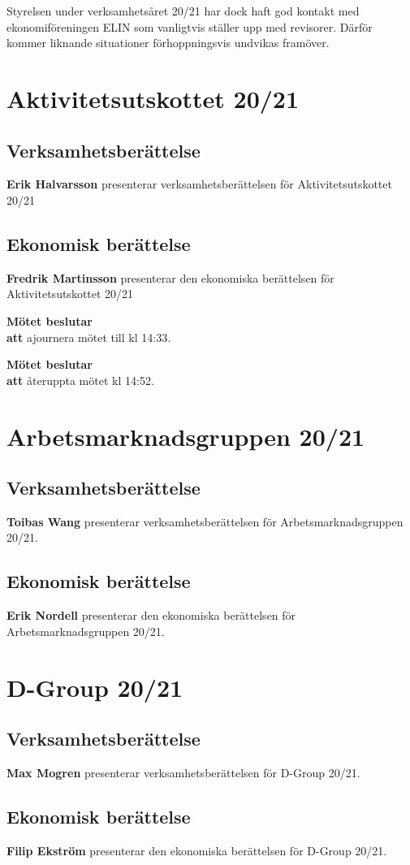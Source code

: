 \documentclass{datateknologsektionen-document}
\newcommand{\ind}{\hspace*{2em}}
\newcommand{\motetbeslutar}{\textbf{Mötet beslutar}}
\newcommand{\att}{\\\ind\textbf{att}}
\begin{document}
Styrelsen under verksamhetsåret 20/21 har dock haft god kontakt med ekonomiföreningen ELIN som vanligtvis ställer upp med revisorer. Därför kommer liknande situationer förhoppningsvis undvikas framöver.

\section{Aktivitetsutskottet 20/21}
\subsection{Verksamhetsberättelse}
\textbf{Erik Halvarsson} presenterar verksamhetsberättelsen för Aktivitetsutskottet 20/21
\subsection{Ekonomisk berättelse}
\textbf{Fredrik Martinsson} presenterar den ekonomiska berättelsen för Aktivitetsutskottet 20/21

\motetbeslutar
\att{} ajournera mötet till kl 14:33.

\motetbeslutar
\att{} återuppta mötet kl 14:52.


\pagebreak
\section{Arbetsmarknadsgruppen 20/21}
\subsection{Verksamhetsberättelse}
\textbf{Toibas Wang} presenterar verksamhetsberättelsen för Arbetsmarknadsgruppen 20/21.
\subsection{Ekonomisk berättelse}
\textbf{Erik Nordell} presenterar den ekonomiska berättelsen för Arbetsmarknadsgruppen 20/21.

\section{D-Group 20/21}
\subsection{Verksamhetsberättelse}
\textbf{Max Mogren} presenterar verksamhetsberättelsen för D-Group 20/21.
\subsection{Ekonomisk berättelse}
\textbf{Filip Ekström} presenterar den ekonomiska berättelsen för D-Group 20/21.
\end{document}
